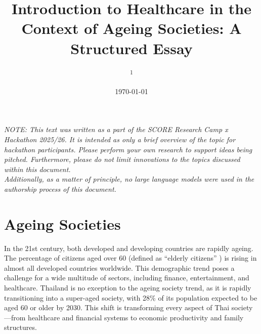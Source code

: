 \documentclass[10pt, a4paper, twocolumn]{article}
\title{Introduction to Healthcare in the Context of Ageing Societies: A Structured Essay}
\author{
    \authorstyle{Natanon Kittimongkolsuk\textsuperscript{1}} 
    \newline\newline 
    \textsuperscript{1}\institution{Medical Student, Chulabhorn International College of Medicine, Thammasat University}\\ 
}
\date{\today}
\begin{document}
\maketitle

\thispagestyle{firstpage} 


\newline{}\emph{NOTE: This text was written as a part of the SCORE Research Camp x Hackathon 2025/26. It is intended as only a brief overview of the topic for
hackathon participants. Please perform your own research to support ideas being pitched. Furthermore, please do not limit innovations to the
topics discussed within this document.\\Additionally, as a matter of principle, no large language models were used in the authorship process of
this document.}

\section{Ageing Societies}
In the 21st century, both developed and developing countries are rapidly ageing. The percentage of citizens aged over 60 (defined as ``elderly citizens'' \cite{reporttcdc}) is rising in almost all developed countries worldwide. This demographic trend poses a challenge
for a wide multitude of sectors, including finance, entertainment, and healthcare. Thailand is no exception to the ageing society trend,
as it is rapidly transitioning into a super-aged society, with 28\% of its population expected to be aged 60 or older by 2030. This shift
is transforming every aspect of Thai society---from healthcare and financial systems to economic productivity and family structures.
\end{document}
